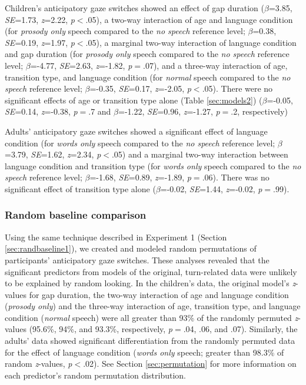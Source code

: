 \documentclass[authoryear, 12pt]{elsarticle}
\begin{document}
Children's anticipatory gaze switches showed an effect of gap duration (\textit{$\beta$}=3.85, \textit{SE}=1.73, \textit{z}=2.22, \textit{p}$<$.05), a two-way interaction of age and language condition (for \textit{prosody only} speech compared to the \textit{no speech} reference level; \textit{$\beta$}=0.38, \textit{SE}=0.19, \textit{z}=1.97, \textit{p}$<$.05), a marginal two-way interaction of language condition and gap duration (for \textit{prosody only} speech compared to the \textit{no speech} reference level; \textit{$\beta$}=-4.77, \textit{SE}=2.63, \textit{z}=-1.82, \textit{p}$=$.07), and a three-way interaction of age, transition type, and language condition (for \textit{normal} speech compared to the \textit{no speech} reference level; \textit{$\beta$}=-0.35, \textit{SE}=0.17, \textit{z}=-2.05, \textit{p}$<$.05). There were no significant effects of age or transition type alone (Table \ref{sec:models2}) (\textit{$\beta$}=-0.05, \textit{SE}=0.14, \textit{z}=-0.38, \textit{p}$=$.7 and \textit{$\beta$}=-1.22, \textit{SE}=0.96, \textit{z}=-1.27, \textit{p}$=$.2, respectively)

Adults' anticipatory gaze switches showed a significant effect of language condition (for \textit{words only} speech compared to the \textit{no speech} reference level; \textit{$\beta$}=3.79, \textit{SE}=1.62, \textit{z}=2.34, \textit{p}$<$.05) and a marginal two-way interaction between language condition and transition type (for \textit{words only} speech compared to the \textit{no speech} reference level; \textit{$\beta$}=-1.68, \textit{SE}=0.89, \textit{z}=-1.89, \textit{p}$=$.06). There was no significant effect of transition type alone (\textit{$\beta$}=-0.02, \textit{SE}=1.44, \textit{z}=-0.02, \textit{p}$=$.99).


\subsubsection*{Random baseline comparison}
\label{sec:randbaseline2}

Using the same technique described in Experiment 1 (Section \ref{sec:randbaseline1}), we created and modeled random permutations of participants' anticipatory gaze switches. These analyses revealed that the significant predictors from models of the original, turn-related data were unlikely to be explained by random looking. In the children's data, the original model's \textit{z}-values for gap duration, the two-way interaction of age and language condition (\textit{prosody only}) and the three-way interaction of age, transition type, and language condition (\textit{normal} speech) were all greater than 93\% of the randomly permuted \textit{z}-values (95.6\%, 94\%, and 93.3\%, respectively, \textit{p}$=$.04, .06, and .07). Similarly, the adults' data showed significant differentiation from the randomly permuted data for the effect of language condition (\textit{words only} speech; greater than 98.3\% of random \textit{z}-values, \textit{p}$<$.02). See Section \ref{sec:permutation} for more information on each predictor's random permutation distribution.
\end{document}
